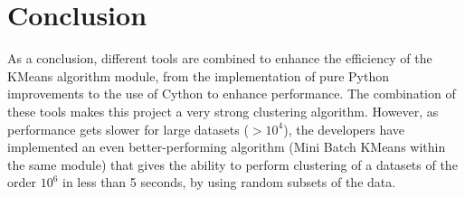 \documentclass[11pt]{article}
\begin{document}
\section*{Conclusion}
As a conclusion, different tools are combined to enhance the efficiency of the KMeans  algorithm module, from the implementation of pure Python improvements to the use of Cython to enhance performance. The combination of these tools makes this project a very strong clustering algorithm. However, as performance gets slower for large datasets ($>10^4$), the developers have implemented an even better-performing algorithm (Mini Batch KMeans within the same module) that gives the ability to perform clustering of a datasets of the order $10^6$ in less than 5 seconds, by using random subsets of the data. \\
\end{document}
